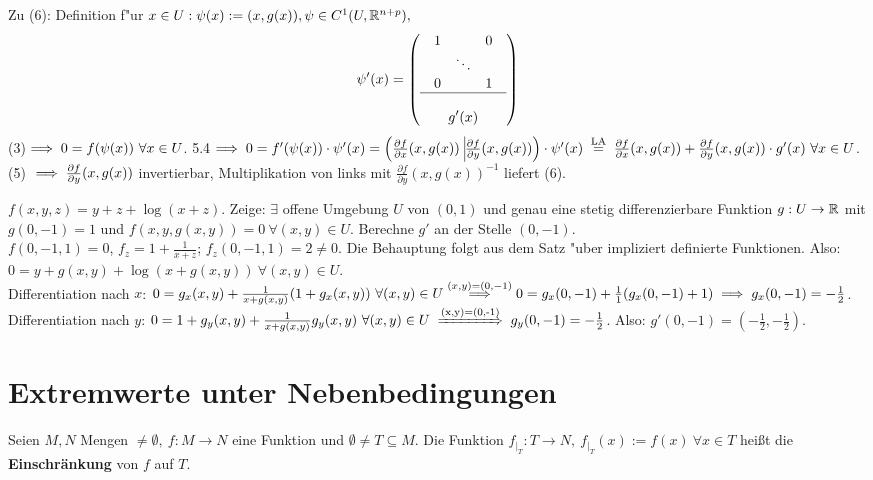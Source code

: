 \documentclass[a4paper,twoside,DIV15,BCOR12mm]{scrbook}
\begin{document}
\begin{beweis}
Zu (6): Definition f"ur $x\in U: \psi(x):=(x,g(x)), \psi\in C^1(U,\mathbb{R}^{n+p}),$
$$\psi'(x)=\left(\begin{array}{c}
\begin{array}{ccc}
1 & & 0 \\
& \ddots & \\
0 & & 1 \\
\end{array}\\
\hline \\
\displaystyle{g'(x)}
\end{array}\right)$$
(3)$\implies 0=f(\psi(x))\ \forall x\in U$. 5.4$\folgt 0=f'(\psi(x))\cdot\psi'(x)=\left(\frac{\partial f}{\partial x}(x, g(x))\ \vline \frac{\partial f}{\partial y}(x, g(x))\right)\cdot\psi'(x)\gleichnach{LA}\frac{\partial f}{\partial x}(x, g(x)) + \frac{\partial f}{\partial y}(x, g(x))\cdot g'(x)\ \forall x\in U$. (5) $\implies \frac{\partial f}{\partial y}(x, g(x))$ invertierbar, Multiplikation von links mit $\frac{\partial f}{\partial y}(x, g(x))^{-1}$ liefert (6).
\end{beweis}

\begin{beispiel}
$f(x,y,z)=y+z+\log(x+z)$. Zeige: $\exists$ offene Umgebung $U$ von $(0,1)$ und genau eine stetig differenzierbare Funktion $g:U\to\mathbb{R}$ mit $g(0,-1)=1$ und $f(x,y,g(x,y))=0\ \forall (x,y)\in U$. Berechne $g'$ an der Stelle $(0,-1)$.\\
$f(0,-1,1)=0$, $f_z=1+\frac{1}{x+z}$; $f_z(0,-1,1)=2\ne 0$. Die Behauptung folgt aus dem Satz "uber impliziert definierte Funktionen. Also: $0=y+g(x,y)+\log(x+g(x,y))\ \forall (x,y)\in U$.\\
Differentiation nach $x$: $0=g_x(x,y)+\frac{1}{x+g(x,y)}(1+g_x(x,y))\ \forall (x,y)\in U\overset{(x,y)=(0,-1)}{\folgt}0=g_x(0,-1)+\frac{1}{1}(g_x(0,-1)+1)\folgt g_x(0,-1)=-\frac{1}{2}$.\\
Differentiation nach $y$: $0=1+g_y(x,y)+\frac{1}{x+g(x,y)}g_y(x,y)\ \forall (x,y)\in U \folgtnach{(x,y)=(0,-1)}g_y(0,-1)=-\frac{1}{2}$. Also: $g'(0,-1)=(-\frac{1}{2},-\frac{1}{2})$.
\end{beispiel}

\chapter{Extremwerte unter Nebenbedingungen}

\begin{definition}
Seien $M,N$ Mengen $\ne \emptyset,\ f:M\to N$ eine Funktion und $\emptyset \ne T \subseteq M$. Die Funktion $f_{|_T}: T \to N,\ f_{|_T}(x) := f(x)\ \forall x \in T$ heißt die \textbf{Einschränkung} von $f$ auf $T$.
\end{definition}
\end{document}
